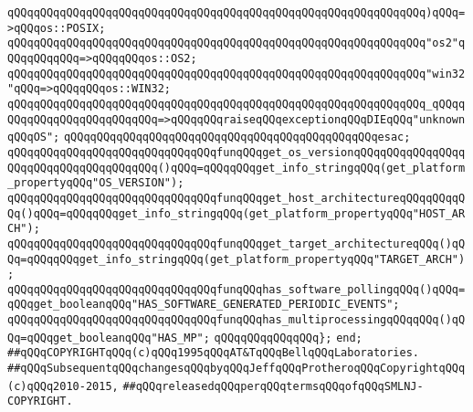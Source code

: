\verb|qQQqqQQqqQQqqQQqqQQqqQQqqQQqqQQqqQQqqQQqqQQqqQQqqQQqqQQqqQQqqQQq)qQQq=>qQQqos::POSIX;|\newline
\newline
\verb|qQQqqQQqqQQqqQQqqQQqqQQqqQQqqQQqqQQqqQQqqQQqqQQqqQQqqQQqqQQqqQQq"os2"qQQqqQQqqQQq=>qQQqqQQqos::OS2;|\newline
\verb|qQQqqQQqqQQqqQQqqQQqqQQqqQQqqQQqqQQqqQQqqQQqqQQqqQQqqQQqqQQqqQQq"win32"qQQq=>qQQqqQQqos::WIN32;|\newline
\verb|qQQqqQQqqQQqqQQqqQQqqQQqqQQqqQQqqQQqqQQqqQQqqQQqqQQqqQQqqQQqqQQq_qQQqqQQqqQQqqQQqqQQqqQQqqQQq=>qQQqqQQqraiseqQQqexceptionqQQqDIEqQQq"unknownqQQqOS";|\newline
\verb|qQQqqQQqqQQqqQQqqQQqqQQqqQQqqQQqqQQqqQQqqQQqqQQqesac;|\newline
\newline
\newline
\verb|qQQqqQQqqQQqqQQqqQQqqQQqqQQqqQQqfunqQQqget_os_versionqQQqqQQqqQQqqQQqqQQqqQQqqQQqqQQqqQQqqQQq()qQQq=qQQqqQQqget_info_stringqQQq(get_platform_propertyqQQq"OS_VERSION");|\newline
\verb|qQQqqQQqqQQqqQQqqQQqqQQqqQQqqQQqfunqQQqget_host_architectureqQQqqQQqqQQq()qQQq=qQQqqQQqget_info_stringqQQq(get_platform_propertyqQQq"HOST_ARCH");|\newline
\verb|qQQqqQQqqQQqqQQqqQQqqQQqqQQqqQQqfunqQQqget_target_architectureqQQq()qQQq=qQQqqQQqget_info_stringqQQq(get_platform_propertyqQQq"TARGET_ARCH");|\newline
\newline
\verb|qQQqqQQqqQQqqQQqqQQqqQQqqQQqqQQqfunqQQqhas_software_pollingqQQq()qQQq=qQQqget_booleanqQQq"HAS_SOFTWARE_GENERATED_PERIODIC_EVENTS";|\newline
\verb|qQQqqQQqqQQqqQQqqQQqqQQqqQQqqQQqfunqQQqhas_multiprocessingqQQqqQQq()qQQq=qQQqget_booleanqQQq"HAS_MP";|\newline
\newline
\verb|qQQqqQQqqQQqqQQq};|\newline
\verb|end;|\newline
\newline
\newline
\newline
\verb|##qQQqCOPYRIGHTqQQq(c)qQQq1995qQQqAT&TqQQqBellqQQqLaboratories.|\newline
\verb|##qQQqSubsequentqQQqchangesqQQqbyqQQqJeffqQQqProtheroqQQqCopyrightqQQq(c)qQQq2010-2015,|\newline
\verb|##qQQqreleasedqQQqperqQQqtermsqQQqofqQQqSMLNJ-COPYRIGHT.|\newline

